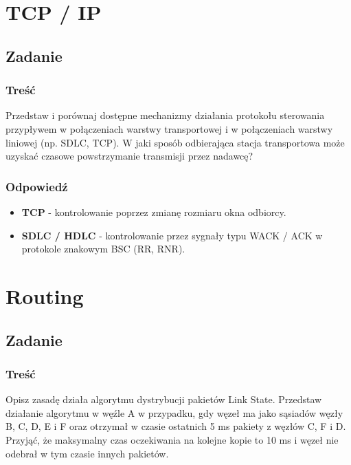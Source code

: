 \section{TCP / IP}
\subsection{Zadanie}
	\subsubsection{Treść}
		Przedstaw i porównaj dostępne mechanizmy działania protokołu sterowania przypływem w połączeniach warstwy transportowej i w połączeniach warstwy liniowej (np. SDLC, TCP). W jaki sposób odbierająca stacja transportowa może uzyskać czasowe powstrzymanie transmisji przez nadawcę?
	\subsubsection{Odpowiedź}
		\begin{itemize}
			\item \textbf{TCP} - kontrolowanie poprzez zmianę rozmiaru okna odbiorcy.
			\item \textbf{SDLC / HDLC} - kontrolowanie przez sygnały typu WACK / ACK w protokole znakowym BSC (RR, RNR).
		\end{itemize}
		


\section{Routing}
	\subsection{Zadanie}
		\subsubsection{Treść}
			Opisz zasadę działa algorytmu dystrybucji pakietów Link State. Przedstaw działanie algorytmu w węźle A w przypadku, gdy węzeł ma jako sąsiadów węzły B, C, D, E i F oraz otrzymał w czasie ostatnich 5 ms pakiety z węzłów C, F i D. Przyjąć, że maksymalny czas oczekiwania na kolejne kopie to 10 ms i węzeł nie odebrał w tym czasie innych pakietów.

